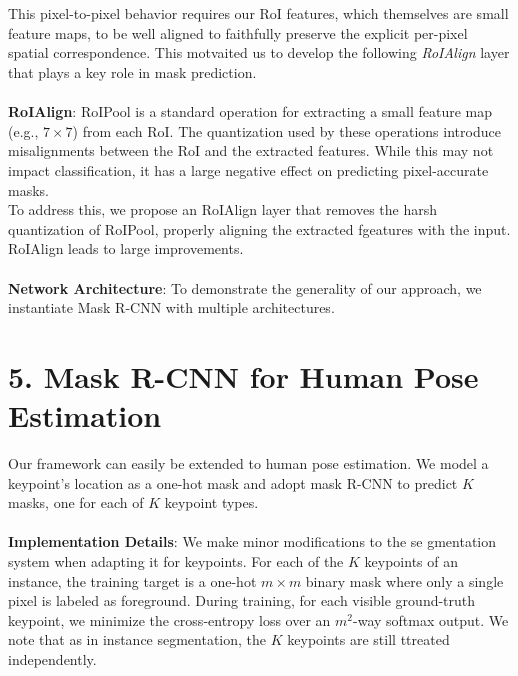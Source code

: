 \documentclass[a4paper]{report}
\begin{document}
\\
\\
This pixel-to-pixel behavior requires our RoI features, which themselves are small feature maps, to be well aligned to faithfully preserve the explicit per-pixel spatial correspondence. This motvaited us to develop the following \textit{RoIAlign} layer that plays a key role in mask prediction.
\\
\\
\textbf{RoIAlign}: RoIPool is a standard operation for extracting a small feature map (e.g., $7 \times 7$) from each RoI. The quantization used by these operations introduce misalignments between the RoI and the extracted features. While this may not impact classification, it has a large negative effect on predicting pixel-accurate masks.
\\
To address this, we propose an RoIAlign layer that removes the harsh quantization of RoIPool, properly aligning the extracted fgeatures with the input. RoIAlign leads to large improvements.
\\
\\
\textbf{Network Architecture}: To demonstrate the generality of our approach, we instantiate Mask R-CNN with multiple architectures.

\section*{5. Mask R-CNN for Human Pose Estimation}
Our framework can easily be extended to human pose estimation. We model a keypoint's location as a one-hot mask and adopt mask R-CNN to predict $K$ masks, one for each of $K$ keypoint types.
\\
\\
\textbf{Implementation Details}: We make minor modifications to the se gmentation system when adapting it for keypoints. For each of the $K$ keypoints of an instance, the training target is a one-hot $m \times m$ binary mask where only a single pixel is labeled as foreground. During training, for each visible ground-truth keypoint, we minimize the cross-entropy loss over an $m^2$-way softmax output. We note that as in instance segmentation, the $K$ keypoints are still ttreated independently.
\end{document}
